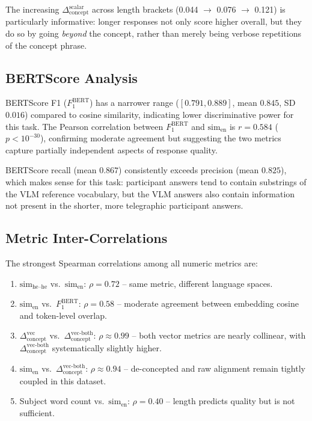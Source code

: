 \documentclass[12pt,a4paper]{article}
\newcommand{\simEN}{\ensuremath{\mathrm{sim}_{\text{en}}}}
\newcommand{\simHH}{\ensuremath{\mathrm{sim}_{\text{he--he}}}}
\newcommand{\SACs}{\ensuremath{\Delta_{\text{concept}}^{\text{scalar}}}}
\newcommand{\SACv}{\ensuremath{\Delta_{\text{concept}}^{\text{vec}}}}
\newcommand{\SACvb}{\ensuremath{\Delta_{\text{concept}}^{\text{vec-both}}}}
\newcommand{\bsF}{\ensuremath{F_1^{\text{BERT}}}}
\begin{document}
The increasing \SACs{} across length brackets (0.044 $\to$ 0.076 $\to$ 0.121) is
particularly informative: longer responses not only score higher overall, but
they do so by going \emph{beyond} the concept, rather than merely being verbose
repetitions of the concept phrase.

\subsection{BERTScore Analysis}

BERTScore F1 (\bsF{}) has a narrower range ($[0.791, 0.889]$, mean $0.845$, SD $0.016$)
compared to cosine similarity, indicating lower discriminative power for this task.
The Pearson correlation between \bsF{} and \simEN{} is $r=0.584$ ($p<10^{-30}$),
confirming moderate agreement but suggesting the two metrics capture partially
independent aspects of response quality.

BERTScore recall (mean $0.867$) consistently exceeds precision (mean $0.825$), which
makes sense for this task: participant answers tend to contain substrings of the VLM
reference vocabulary, but the VLM answers also contain information not present in the
shorter, more telegraphic participant answers.

\subsection{Metric Inter-Correlations}
\label{sec:correlations}

The strongest Spearman correlations among all numeric metrics are:

\begin{enumerate}[noitemsep]
  \item $\simHH{}$ vs.\ \simEN{}: $\rho = 0.72$ -- same metric, different language
        spaces.
  \item \simEN{} vs.\ \bsF{}: $\rho = 0.58$ -- moderate agreement between embedding
        cosine and token-level overlap.
  \item \SACv{} vs.\ \SACvb{}: $\rho \approx 0.99$ -- both vector metrics are nearly
        collinear, with \SACvb{} systematically slightly higher.
  \item \simEN{} vs.\ \SACvb{}: $\rho \approx 0.94$ -- de-concepted and raw alignment
        remain tightly coupled in this dataset.
  \item Subject word count vs.\ \simEN{}: $\rho = 0.40$ -- length predicts quality
        but is not sufficient.
\end{enumerate}
\end{document}

